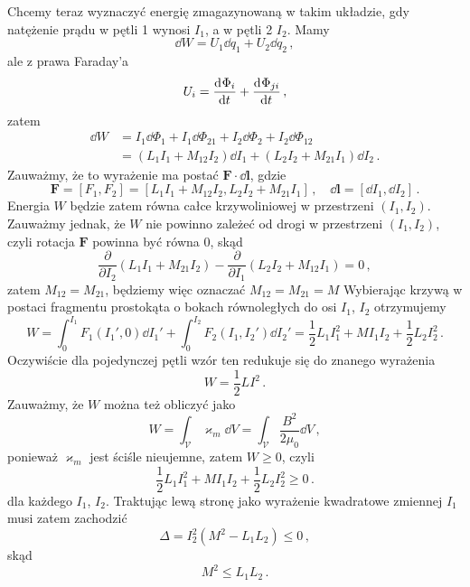 \documentclass[../main.tex]{subfiles}
\begin{document}
Chcemy teraz wyznaczyć energię zmagazynowaną w takim układzie, gdy natężenie prądu w pętli 1 wynosi
\(I_1\), a w pętli 2 \(I_2\). Mamy
\begin{equation*}
    \dd{W}=U_1\dd{q_1}+U_2\dd{q_2}\,,
\end{equation*}
ale z prawa Faraday'a
\begin{equation*}
    U_i=\dv[]{\Phi_i}{t}+\dv[]{\Phi_{ji}}{t}\,,
\end{equation*}
zatem
\begin{equation*}
\begin{split}
    \dd{W}&=I_1\dd{\Phi_1}+I_1\dd{\Phi_{21}}+I_2\dd{\Phi_2}+I_2\dd{\Phi_{12}}\\
    &=(L_1I_1+M_{12}I_2)\dd{I_1}+(L_2I_2+M_{21}I_1)\dd{I_2}\,.
\end{split}
\end{equation*}
Zauważmy, że to wyrażenie ma postać \(\mathbf{F}\cdot\dd{\mathbf{l}}\), gdzie
\begin{equation*}
    \mathbf{F}=[F_1,F_2]=[L_1I_1+M_{12}I_2,L_2I_2+M_{21}I_1]\,,\quad\dd{\mathbf{l}}=[\dd{I_1},\dd{I_2}]\,.
\end{equation*}
Energia \(W\) będzie zatem równa całce krzywoliniowej w przestrzeni \((I_1,I_2)\). Zauważmy jednak,
że \(W\) nie powinno zależeć od drogi w przestrzeni \((I_1,I_2)\), czyli rotacja \(\mathbf{F}\)
powinna być równa 0, skąd
\begin{equation*}
    \frac{\partial}{\partial I_2}(L_1I_1+M_{21}I_2)-\frac{\partial}{\partial I_1}(L_2I_2+M_{12}I_1)=0\,,
\end{equation*}
zatem \(M_{12}=M_{21}\), będziemy więc oznaczać \(M_{12}=M_{21}=M\) Wybierając krzywą w postaci
fragmentu prostokąta o bokach równoległych do osi \(I_1\), \(I_2\) otrzymujemy
\begin{equation*}
    W=\int_0^{I_1} F_1(I_1',0)\dd{I_1'}+\int_0^{I_2}F_2(I_1,I_2')\dd{I_2'}=\frac{1}{2}L_1I_1^2+MI_1I_2+\frac{1}{2}L_2I_2^2\,.
\end{equation*}
Oczywiście dla pojedynczej pętli wzór ten redukuje się do znanego wyrażenia
\begin{equation*}
    W=\frac{1}{2}LI^2\,.
\end{equation*}
Zauważmy, że \(W\) można też obliczyć jako
\begin{equation*}
    W=\int_\mathcal{V}\varkappa_m\dd{V}=\int_\mathcal{V}\frac{B^2}{2\mu_0}\dd{V}\,,
\end{equation*}
ponieważ \(\varkappa_m\) jest ściśle nieujemne, zatem \(W\geq 0\), czyli
\begin{equation*}
    \frac{1}{2}L_1I_1^2+MI_1I_2+\frac{1}{2}L_2I_2^2\geq 0\,.
\end{equation*}
dla każdego \(I_1\), \(I_2\). Traktując lewą stronę jako wyrażenie kwadratowe zmiennej \(I_1\) musi
zatem zachodzić
\begin{equation*}
    \Delta=I_2^2(M^2-L_1L_2)\leq 0\,,
\end{equation*}
skąd
\begin{equation*}
    M^2\leq L_1L_2\,.
\end{equation*}
\end{document}

